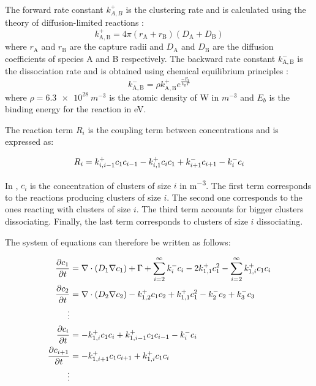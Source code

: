The forward rate constant $k^+_{A,B}$ is the clustering rate and is calculated using the theory of diffusion-limited reactions :
\begin{equation}
    k^+_\mathrm{A,B} = 4 \pi (r_\mathrm{A} + r_\mathrm{B}) (D_\mathrm{A} + D_\mathrm{B})
\end{equation}
where $r_\mathrm{A}$ and $r_\mathrm{B}$ are the capture radii and $D_\mathrm{A}$ and $D_\mathrm{B}$ are the diffusion coefficients of species A and B respectively.
The backward rate constant $k^-_\mathrm{A,B}$ is the dissociation rate and is obtained using chemical equilibrium principles \cite{goldstein_diffusion_2007}:
\begin{equation}
    k^-_\mathrm{A,B} =\rho k^+_\mathrm{A,B}e^{\frac{-E_b}{k_B T}}
\end{equation}
where $\rho = \SI{6.3e28}{m^{-3}}$ is the atomic density of W in $\si{m^{-3}}$ and $E_b$ is the binding energy for the reaction  in \si{eV}.

The reaction term $R_i$ is the coupling term between concentrations and is expressed as:

\begin{equation}
    R_i=  k^+_{i,i-1} c_1 c_{i-1}  - k_{i, 1}^+ c_i  c_{1} + k_{i+1}^- c_{i+1} -  k_i^- c_i
    \labeq{reaction term}
\end{equation}


In , $c_i$ is the concentration of clusters of size $i$ in \si{m^{-3}}.
The first term corresponds to the reactions producing clusters of size $i$.
The second one corresponds to the ones reacting with clusters of size $i$.
The third term accounts for bigger clusters dissociating.
Finally, the last term corresponds to clusters of size $i$ dissociating.

The system of equations can therefore be written as follows:

\begin{subequations}
    \begin{align}
        \frac{\partial c_1}{\partial t} &= \nabla \cdot (D_1 \nabla c_1) + \Gamma + \sum\limits_{i=2}^\infty k_{i}^- c_i - 2k_{1, 1}^+ c_1^2 - \sum\limits_{i=2}^\infty k_{1,i}^+ c_1 c_i \\
        \frac{\partial c_2}{\partial t} &= \nabla \cdot (D_2 \nabla c_2) - k_{1, 2}^+ c_1 c_2 + k_{1, 1}^+ c_1^2 - k_{2}^- c_2 + k_{3}^- c_3\\
        \vdots \nonumber\\
        \frac{\partial c_i}{\partial t} &= - k_{1, i}^+ c_1 c_i + k_{1, i-1}^+ c_1 c_{i-1} - k_{i}^- c_i\\
        \frac{\partial c_{i+1}}{\partial t} &= - k_{1, i+1}^+ c_1 c_{i+1} + k_{1, i}^+ c_1 c_i\\
        \vdots \nonumber
    \end{align}
    \labeq{temporal evolution no grouping}
\end{subequations}

